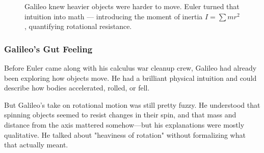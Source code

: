 \begin{figure}[H]
\centering
{}
\caption{Galileo knew heavier objects were harder to move. Euler turned that intuition into math — introducing the moment of inertia $I = \sum m r^2$, quantifying rotational resistance.}
\end{figure}



\subsubsection{Galileo’s Gut Feeling}

Before Euler came along with his calculus war cleanup crew, Galileo had already been exploring how objects move. He had a brilliant physical intuition and could describe how bodies accelerated, rolled, or fell. 

But Galileo's take on rotational motion was still pretty fuzzy. He understood that spinning objects seemed to resist changes in their spin, and that mass and distance from the axis mattered somehow—but his explanations were mostly qualitative. He talked about "heaviness of rotation" without formalizing what that actually meant.

